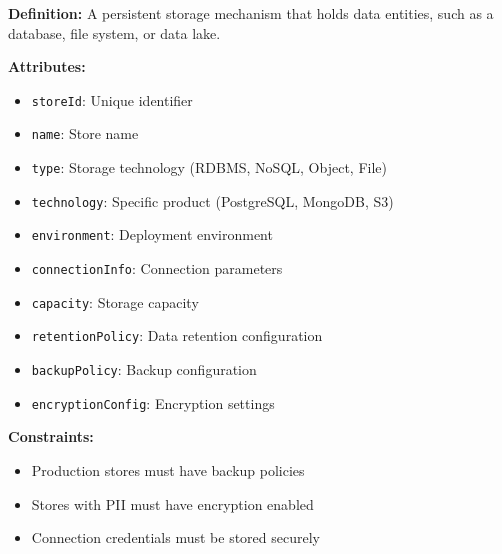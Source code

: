 \documentclass[11pt,letterpaper]{article}
\begin{document}
\begin{definitionbox}
\textbf{Definition:} A persistent storage mechanism that holds data entities, such as a database, file system, or data lake.

\textbf{Attributes:}
\begin{itemize}[nosep]
    \item \texttt{storeId}: Unique identifier
    \item \texttt{name}: Store name
    \item \texttt{type}: Storage technology (RDBMS, NoSQL, Object, File)
    \item \texttt{technology}: Specific product (PostgreSQL, MongoDB, S3)
    \item \texttt{environment}: Deployment environment
    \item \texttt{connectionInfo}: Connection parameters
    \item \texttt{capacity}: Storage capacity
    \item \texttt{retentionPolicy}: Data retention configuration
    \item \texttt{backupPolicy}: Backup configuration
    \item \texttt{encryptionConfig}: Encryption settings
\end{itemize}

\textbf{Constraints:}
\begin{itemize}[nosep]
    \item Production stores must have backup policies
    \item Stores with PII must have encryption enabled
    \item Connection credentials must be stored securely
\end{itemize}
\end{definitionbox}
\end{document}
